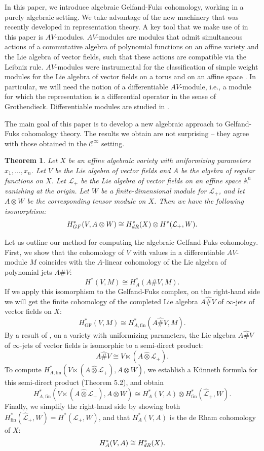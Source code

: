 \documentclass[12pt]{amsart}
\renewcommand{\L}{{\mathcal{L}}}
\newcommand{\DR}{{\textup{dR}}}
\newcommand{\GF}{{\textup{GF}}}
\newcommand{\wo}{\widehat{\otimes}}
\newtheorem{theorem}{Theorem}[section]
\theoremstyle{definition}
\begin{document}
In this paper, we introduce algebraic Gelfand-Fuks cohomology, working in a purely algebraic setting. We take advantage of the new machinery that was recently developed in representation theory. A key tool that we make use of in this paper is $AV$-modules. $AV$-modules are modules that admit simultaneous actions of a commutative algebra of polynomial functions on an affine variety and the Lie algebra of vector fields, such that these actions are compatible via the Leibniz rule. $AV$-modules were instrumental for the classification of simple weight modules for the Lie algebra of vector fields on a torus \cite{BilligFutorny2016} and on an affine space \cite{XL2023, GS2022}. In particular, we will need the notion of a differentiable $AV$-module, i.e., a module for which the representation is a differential operator in the sense of Grothendieck. Differentiable modules are studied in \cite{BouazizRocha}. 

The main goal of this paper is to develop a new algebraic approach to Gelfand-Fuks cohomology theory. The results we obtain are not surprising -- they agree with those obtained in the $\mathcal{C}^\infty$ setting. 

\begin{theorem}\label{theorem:intro}
Let $X$ be an affine algebraic variety with uniformizing parameters $x_1, \dots, x_n$. Let $V$ be the Lie algebra of vector fields and $A$ be the algebra of regular functions on $X$. Let $\L_+$ be the Lie algebra of vector fields on an affine space $\mathbb{A}^n$ vanishing at the origin. 
Let $W$ be a finite-dimensional module for $\L_+$, and let $A \otimes W$
be the corresponding tensor module on $X$. 
Then we have the following isomorphism:
\[
H^*_{\GF}(V, A \otimes W) \cong H_{\DR}^*(X) \otimes H^*(\L_+, W).
\] 
\end{theorem}

Let us outline our method for computing the algebraic Gelfand-Fuks cohomology.
First, we show that the cohomology of $V$ with values in a differentiable $AV$-module $M$ coincides with the $A$-linear cohomology of the Lie algebra of polynomial jets $A \# V$:
\[
H^* (V, M) \cong H^*_A (A\# V, M).
\]
If we apply this isomorphism to the Gelfand-Fuks complex, on the right-hand side we will get the finite cohomology of the completed Lie algebra $A\widehat{\#}V$ of $\infty$-jets of vector fields on $X$:
\[
H^*_\text{GF} (V, M) \cong H^*_{A,\text{fin}} (A\widehat{\#} V, M).
\]
By a result of \cite{BilligIngallsNasr, BilligIngalls}, on a variety with uniformizing parameters, the Lie algebra $A\widehat{\#}V$ of $\infty$-jets of vector fields is isomorphic to a semi-direct product:
\[
A\widehat{\#} V \cong V \ltimes (A \wo \L_+).
\]
To compute $H^*_{A,\text{fin}} ( V \ltimes (A \wo \L_+), A \otimes W)$, we establish a K\"unneth formula for this semi-direct product (Theorem 5.2), and obtain
\[
H^*_{A,\text{fin}} ( V \ltimes (A \wo \L_+), A \otimes W) \cong
H^*_A (V, A) \otimes H^*_\text{fin} (\widehat{\L}_+, W).
\]
Finally, we simplify the right-hand side by showing both $H^*_\text{fin} (\widehat{\L}_+, W) = H^* (\L_+, W)$, and that $H^*_A (V, A)$ 
is the de Rham cohomology of $X$:
\[
H^*_A (V, A) \cong H_{\DR}^*(X).
\]
\end{document}

